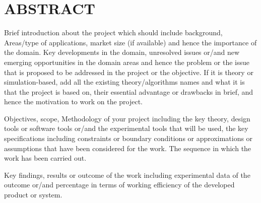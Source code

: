 \chapter*{ABSTRACT}

Brief introduction about the project which should include background, Areas/type of applications, market size (if available) and hence the importance of the domain. Key developments in the domain, unresolved issues or/and new emerging opportunities in the domain areas and hence the problem or the issue that is proposed to be addressed in the project or the objective. If it is theory or simulation-based, add all the existing theory/algorithms names and what it is that the project is based on, their essential advantage or drawbacks in brief, and hence the motivation to work on the project.

Objectives, scope, Methodology of your project including the key theory, design tools or software tools or/and the experimental tools that will be used, the key specifications including constraints or boundary conditions or approximations or assumptions that have been considered for the work. The sequence in which the work has been carried out.

Key findings, results or outcome of the work including experimental data of the outcome or/and percentage in terms of working efficiency of the developed product or system.